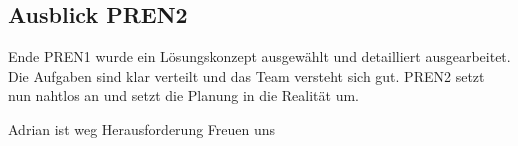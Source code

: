 \subsection{Ausblick PREN2}

Ende PREN1 wurde ein Lösungskonzept ausgewählt und detailliert ausgearbeitet.
Die Aufgaben sind klar verteilt und das Team versteht sich gut. PREN2 setzt nun nahtlos an und setzt die Planung in die Realität um.

Adrian ist weg
Herausforderung
Freuen uns